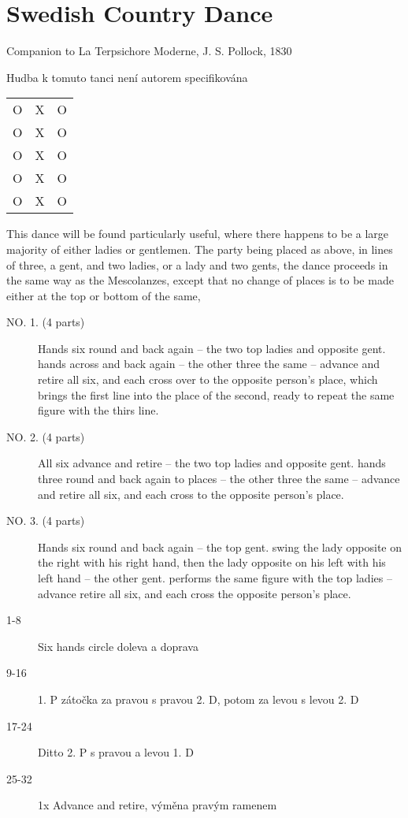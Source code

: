 \chapter{Swedish Country Dance}
{\large\hfill Companion to La Terpsichore Moderne, J. S. Pollock, 1830}
\begin{center}
{\large Hudba k tomuto tanci není autorem specifikována}
\end{center}
\vspace{1em}
\HRule
\vspace{0.5em}
\begin{multicols}{2}
\begin{center}
\begin{tabular}{ c c c }
 O & X & O \\ 
 O & X & O \\ 
 O & X & O \\ 
 O & X & O \\ 
 O & X & O
\end{tabular}
\end{center}
This dance will be found particularly useful, where there happens to be a large majority of either ladies or gentlemen. The party being placed as above, in lines of three, a gent, and two ladies, or a lady and two gents, the dance proceeds in the same way as the Mescolanzes, except that no change of places is to be made either at the top or bottom of the same,

\columnbreak

\begin{description}
    \item[NO. 1. (4 parts)] Hands six round and back again -- the two top ladies and opposite gent. hands across and back again -- the other three the same -- advance and retire all six, and each cross over to the opposite person's place, which brings the first line into the place of the second, ready to repeat the same figure with the thirs line.
    \item[NO. 2. (4 parts)] All six advance and retire -- the two top ladies and opposite gent. hands three round and back again to places -- the other three the same -- advance and retire all six, and each cross to the opposite person's place.
    \item[NO. 3. (4 parts)] Hands six round and back again -- the top gent. swing the lady opposite on the right with his right hand, then the lady opposite on his left with his left hand -- the other gent. performs the same figure with the top ladies -- advance retire all six, and each cross the opposite person's place.
\end{description}
\end{multicols}
\vspace{1.5em}
\HRule
\HRule

\vspace{1.5em}
\begin{description}
    \item[1-8] Six hands circle doleva a doprava
    \item[9-16] 1. P zátočka za pravou s pravou 2. D, potom za levou s levou 2. D
    \item[17-24] Ditto 2. P s pravou a levou 1. D
    \item [25-32] 1x Advance and retire, výměna pravým ramenem
\end{description}
